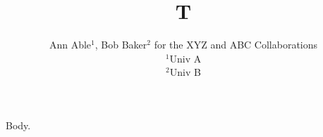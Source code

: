 \documentclass{article}
\begin{document}
\title{T}
\author{Ann Able$^{1}$, Bob Baker$^{2}$ for the XYZ and ABC Collaborations\\ $^1$Univ A\\ $^2$Univ B}
\maketitle
Body.
\end{document}
